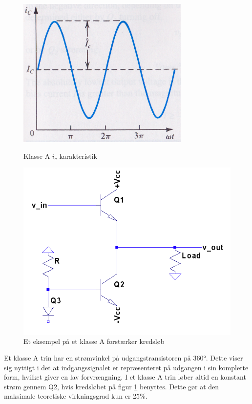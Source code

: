\begin{figure}[ht]
\begin{minipage}[b]{0.5\linewidth}
\centering
\includegraphics[scale=.35]{valg_af_loesning/klasser/klassea.png}
\caption{Klasse A $i_c$ karakteristik}
\label{fig:klassea}
\end{minipage}
\hspace{0.5cm}
\begin{minipage}[b]{0.5\linewidth}
\centering
\includegraphics[scale=.35]{valg_af_loesning/klasser/classa.png}
\caption{Et eksempel på et klasse A forstærker kredsløb}
\label{fig:classa}
\end{minipage}
\end{figure}


Et klasse A trin har en strømvinkel på udgangstransistoren på 360°. Dette viser sig nyttigt i det at indgangssignalet er repræsenteret på udgangen i sin komplette form, hvilket giver en lav forvrængning.
I et klasse A trin løber altid en konstant strøm gennem Q2, hvis kredsløbet på figur \ref{fig:classa} benyttes. Dette gør at den maksimale teoretiske virkningsgrad kun er 25\%. 

